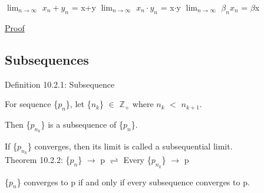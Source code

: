 \begin{enumerate}[label=(\alph*), leftmargin=2cm, itemsep=0.1cm]
        $\lim_{n \rightarrow \infty}$ $x_n + y_n$ = x+y
        \hspace{0.5cm}
        $\lim_{n \rightarrow \infty}$ $x_n \cdot y_n$ = x$\cdot$y
        \hspace{0.5cm}
        $\lim_{n \rightarrow \infty}$ $\beta_n x_n$ = $\beta$x

            { \color{magenta} \underline{Proof} }

    \end{enumerate}





\subsection{ Subsequences }

{ \color{blue} Definition 10.2.1: Subsequence } 

    \begin{adjustbox}{minipage=14cm, right, vspace=0.1cm 0cm}
        For sequence \{$p_n$\}, let \{$n_k$\} $\in$ $\mathbb{Z}_+$
        where $n_k$ $<$ $n_{k+1}$.

        Then \{$p_{n_k}$\} is a subsequence of \{$p_n$\}.
        
        If \{$p_{n_k}$\} converges, then its limit is called
        a subsequential limit. \\
	\end{adjustbox}

{ \color{red} Theorem 10.2.2:
\{$p_n$\} $\rightarrow$ p $\rightleftharpoons$ Every \{$p_{n_k}$\} $\rightarrow$ p }

    \begin{adjustbox}{minipage=14cm, right, vspace=0.1cm 0cm}
        \{$p_n$\} converges to p if and only if every subsequence
        converges to p.
    \end{adjustbox}

